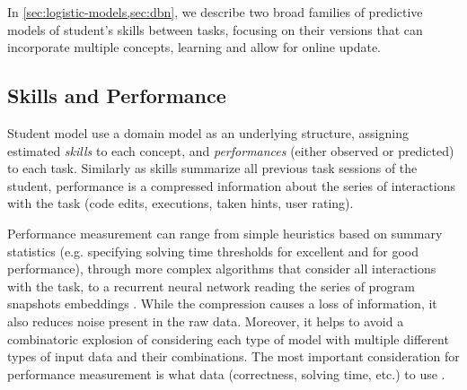 In \cref{sec:logistic-models,sec:dbn}, we describe two broad
families of predictive models of student's skills between tasks,
focusing on their versions %
that can incorporate multiple concepts, learning and allow for online update. %

\subsection{Skills and Performance}

Student model use a domain model as an underlying structure,
assigning estimated \emph{skills} to each concept, %
and \emph{performances} (either observed or predicted) to each task.
Similarly as skills summarize all previous task sessions of the student,
performance is a compressed information about the series of
interactions with the task (code edits, executions, taken hints, user rating). %

Performance measurement can range from simple heuristics based on summary statistics
(e.g. specifying solving time thresholds for excellent and for good performance),
through more complex algorithms that consider all interactions with the task,
to a recurrent neural network reading the series
of program snapshots embeddings  %
\cite{student-models-deep-learning}.
While the compression causes a loss of information, it also reduces noise
present in the raw data. Moreover, it helps to avoid a combinatoric
explosion of considering each type of model with multiple different types of
input data and their combinations.
The most important consideration for performance measurement is what data
(correctness, solving time, etc.) to use \cite{alg.mastery}.

